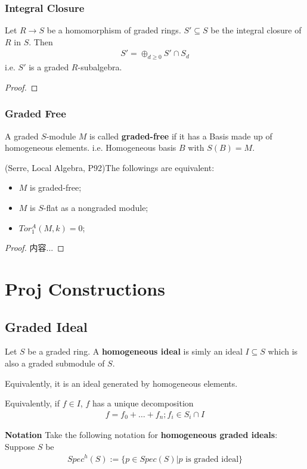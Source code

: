 \documentclass[Total.tex]{subfiles}
\begin{document}
			\subsubsection{Integral Closure}
			\begin{lemma}
				Let $R\rightarrow S$ be a homomorphism of graded rings. $S'\subseteq S$ be the integral closure of $R$ in $S$. Then
				\begin{gather*}
					S'=\oplus_{d\geq 0} S'\cap S_d
				\end{gather*}
				i.e. $S'$ is a graded $R$-subalgebra.
			\end{lemma}
			\begin{proof}
				
			\end{proof}
			\subsubsection{Graded Free}
			\begin{Def}
				A graded $S$-module $M$ is called \textbf{graded-free} if it has a Basis made up of homogeneous elements. i.e. Homogeneous basis $B$ with $S(B)=M$.
			\end{Def}
			
			\begin{lemma}
				(Serre, Local Algebra, P92)The followings are equivalent:
				\begin{itemize}
					\item $M$ is graded-free;
					\item $M$ is $S$-flat as a nongraded module;
					\item $Tor_1^A(M,k)=0$;
				\end{itemize}
			\end{lemma}
			\begin{proof}
				内容...
			\end{proof}
		\section{Proj Constructions}
			\subsection{Graded Ideal}
			\begin{Def}
				Let $S$ be a graded ring. A \textbf{homogeneous ideal} is simly an ideal $I\subseteq S$ which is also a graded submodule of $S$.
				
				 Equivalently, it is an ideal generated by homogeneous elements. 
				 
				 Equivalently, if $f\in I$, $f$ has a unique decomposition
				 \begin{gather*}
				 	f=f_0+\dots+f_n;f_i\in S_i\cap I
				 \end{gather*}
			\end{Def}
			\textbf{Notation} Take the following notation for \textbf{homogeneous graded ideals}: Suppose $S$ be 
			\begin{gather*}
				Spec^h(S):=\{p\in Spec(S)|p\mbox{ is graded ideal}\}
			\end{gather*}
\end{document}
